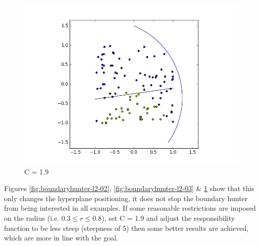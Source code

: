 \documentclass[notitlepage]{report}
\theoremstyle{definition}
\begin{document}
\begin{figure}[H]
\begin{minipage}[b]{0.49\textwidth}
    \includegraphics[width=\textwidth]{BoundaryHunter-Attempt3-04.png}
    \caption{C = 1.9}
    \label{fig:boundaryhunter-l2-04}
  \end{minipage}
\end{figure}

Figures \ref{fig:boundaryhunter-l2-02}, \ref{fig:boundaryhunter-l2-03} \& \ref{fig:boundaryhunter-l2-04} show that this only changes the hyperplane positioning, it does not stop the boundary hunter from being interested in all examples. If some reasonable restrictions are imposed on the radius (i.e. $0.3 \leq r \leq 0.8$), set C = 1.9 and adjust the responsibility function to be less steep (steepness of 5) then some better results are achieved, which are more in line with the goal.
\end{document}
